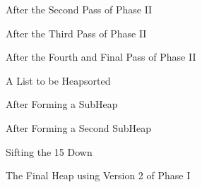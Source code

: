 \documentclass[letterpaper,10pt,english]{sphinxmanual}
\begin{document}
\begin{figure}[htbp]
\centering
\capstart

\noindent{}
\caption{After the Second Pass of Phase II}\label{\detokenize{chap8/chap8:id15}}\end{figure}

\begin{figure}[htbp]
\centering
\capstart

\noindent{}
\caption{After the Third Pass of Phase II}\label{\detokenize{chap8/chap8:id16}}\end{figure}

\begin{figure}[htbp]
\centering
\capstart

\noindent{}
\caption{After the Fourth and Final Pass of Phase II}\label{\detokenize{chap8/chap8:id17}}\end{figure}

\begin{figure}[htbp]
\centering
\capstart

\noindent{}
\caption{A List to be Heapsorted}\label{\detokenize{chap8/chap8:id18}}\end{figure}

\begin{figure}[htbp]
\centering
\capstart

\noindent{}
\caption{After Forming a Sub\sphinxhyphen{}Heap}\label{\detokenize{chap8/chap8:id19}}\end{figure}

\begin{figure}[htbp]
\centering
\capstart

\noindent{}
\caption{After Forming a Second Sub\sphinxhyphen{}Heap}\label{\detokenize{chap8/chap8:id20}}\end{figure}

\begin{figure}[htbp]
\centering
\capstart

\noindent{}
\caption{Sifting the 15 Down}\label{\detokenize{chap8/chap8:id21}}\end{figure}

\begin{figure}[htbp]
\centering
\capstart

\noindent{}
\caption{The Final Heap using Version 2 of Phase I}\label{\detokenize{chap8/chap8:id22}}\end{figure}
\end{document}
